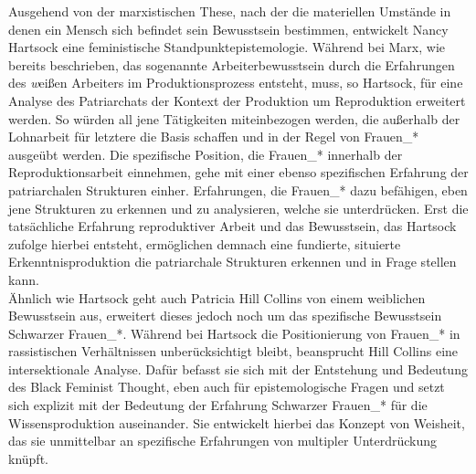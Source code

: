 Ausgehend von der marxistischen These, nach der die materiellen Umstände in
denen ein Mensch sich befindet sein Bewusstsein bestimmen, entwickelt Nancy
Hartsock eine feministische Standpunktepistemologie. Während bei Marx, wie
bereits beschrieben, das sogenannte Arbeiterbewusstsein durch die Erfahrungen des
\textit{w}eißen Arbeiters im Produktionsprozess entsteht, muss, so Hartsock, für eine
Analyse des Patriarchats der Kontext der Produktion um Reproduktion erweitert
werden. So würden all jene Tätigkeiten miteinbezogen werden, die außerhalb der
Lohnarbeit für letztere die Basis schaffen und in der Regel von Frauen\_*
ausgeübt werden. Die spezifische Position, die Frauen\_* innerhalb der
Reproduktionsarbeit einnehmen, gehe mit einer ebenso spezifischen Erfahrung der
patriarchalen Strukturen einher. Erfahrungen, die Frauen\_* dazu befähigen, eben
jene Strukturen zu erkennen und zu analysieren, welche sie unterdrücken. Erst
die tatsächliche Erfahrung reproduktiver Arbeit und das Bewusstsein, das
Hartsock zufolge hierbei entsteht, ermöglichen demnach eine fundierte,
situierte Erkenntnisproduktion die patriarchale Strukturen erkennen und in
Frage stellen kann.\footnotemark {}\\ 

Ähnlich wie Hartsock geht auch Patricia Hill Collins von einem weiblichen
Bewusstsein aus, erweitert dieses jedoch noch um das spezifische Bewusstsein
Schwarzer Frauen\_*. Während bei Hartsock die Positionierung von Frauen\_* in
rassistischen Verhältnissen unberücksichtigt bleibt, beansprucht Hill Collins
eine intersektionale Analyse. Dafür befasst sie sich mit der Entstehung und
Bedeutung des Black Feminist Thought, eben auch für epistemologische Fragen und
setzt sich explizit mit der Bedeutung der Erfahrung Schwarzer Frauen\_* für
die Wissensproduktion auseinander. Sie entwickelt hierbei das Konzept von
Weisheit, das sie unmittelbar an spezifische Erfahrungen von multipler
Unterdrückung knüpft.\footnotemark {}\\ 

